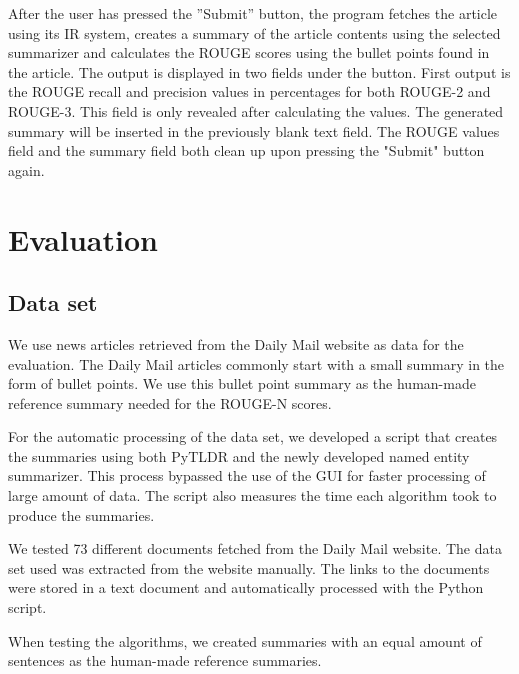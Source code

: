 \documentclass[conference]{IEEEtran}
\begin{document}
After the user has pressed the ”Submit” button, the program fetches the article using its IR system, creates a summary of the article contents using the selected summarizer and calculates the ROUGE scores using the bullet points found in the article. 
The output is displayed in two fields under the button. 
First output is the ROUGE recall and precision values in percentages for both ROUGE-2 and ROUGE-3. This field is only revealed after calculating the values. The generated summary will be inserted in the previously blank text field. The ROUGE values field and the summary field both clean up upon pressing the "Submit" button again.

\section{Evaluation}\label{results}
\subsection{Data set}\label{data}
We use news articles retrieved from the Daily Mail website as data for the evaluation. The Daily Mail articles commonly start with a small summary in the form of bullet points. We use this bullet point summary as the human-made reference summary needed for the ROUGE-N scores. 

For the automatic processing of the data set, we developed a script that creates the summaries using both PyTLDR and the newly developed named entity summarizer. This process bypassed the use of the GUI for faster processing of large amount of data. The script also measures the time each algorithm took to produce the summaries. 

We tested 73 different documents fetched from the Daily Mail website. The data set used was extracted from the website manually. The links to the documents were stored in a text document and automatically processed with the Python script. %

When testing the algorithms, we created summaries with an equal amount of sentences as the human-made reference summaries.
\end{document}
